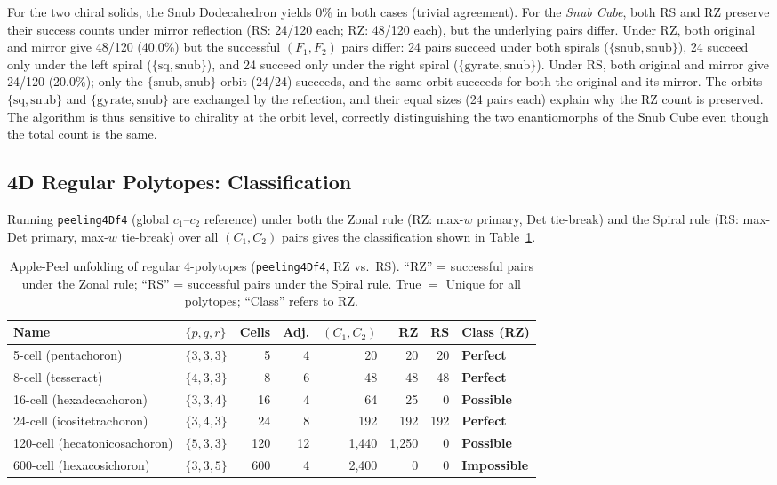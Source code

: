 \documentclass[12pt,a4paper]{article}
\theoremstyle{definition}
\begin{document}
For the two chiral solids, the Snub Dodecahedron yields 0\% in both cases
(trivial agreement).
For the \emph{Snub Cube}, both RS and RZ preserve their success counts
under mirror reflection (RS: 24/120 each; RZ: 48/120 each),
but the underlying pairs differ.
Under RZ, both original and mirror give 48/120 (40.0\%) but
the successful $(F_1,F_2)$ pairs differ: 24 pairs succeed under both spirals
($\{\mathrm{snub},\mathrm{snub}\}$), 24 succeed only under the left spiral
($\{\mathrm{sq},\mathrm{snub}\}$), and 24 succeed only under the right spiral
($\{\mathrm{gyrate},\mathrm{snub}\}$).
Under RS, both original and mirror give 24/120 (20.0\%);
only the $\{\mathrm{snub},\mathrm{snub}\}$ orbit (24/24) succeeds,
and the same orbit succeeds for both the original and its mirror.
The orbits $\{\mathrm{sq},\mathrm{snub}\}$ and $\{\mathrm{gyrate},\mathrm{snub}\}$
are exchanged by the reflection, and their equal sizes (24 pairs each) explain
why the RZ count is preserved.
The algorithm is thus sensitive to chirality at the orbit level, correctly
distinguishing the two enantiomorphs of the Snub Cube even though the total
count is the same.

\subsection{4D Regular Polytopes: Classification}
\label{ssec:res4d}

Running \texttt{peeling4Df4} (global $c_1$--$c_2$ reference) under both
the Zonal rule (RZ: max-$w$ primary, Det tie-break) and the Spiral rule
(RS: max-Det primary, max-$w$ tie-break)
over all $(C_1, C_2)$ pairs gives the classification shown in
Table~\ref{tab:results}.

\begin{table}[h]
\centering
\caption{Apple-Peel unfolding of regular 4-polytopes (\texttt{peeling4Df4}, RZ vs.\ RS).
  ``RZ'' = successful pairs under the Zonal rule; ``RS'' = successful pairs under
  the Spiral rule. True $=$ Unique for all polytopes; ``Class'' refers to RZ.}
\label{tab:results}
\small
\setlength{\tabcolsep}{3pt}
\begin{tabular}{llrrrrrl}
\toprule
Name & $\{p,q,r\}$ & Cells & Adj. & $(C_1,C_2)$ & RZ & RS & Class (RZ) \\
\midrule
5-cell (pentachoron)           & $\{3,3,3\}$ &   5 &  4 &    20   &     20 &     20 & \textbf{Perfect}    \\
8-cell (tesseract)             & $\{4,3,3\}$ &   8 &  6 &    48   &     48 &     48 & \textbf{Perfect}    \\
16-cell (hexadecachoron)       & $\{3,3,4\}$ &  16 &  4 &    64   &     25 &      0 & \textbf{Possible}   \\
24-cell (icositetrachoron)     & $\{3,4,3\}$ &  24 &  8 &   192   &    192 &    192 & \textbf{Perfect}    \\
120-cell (hecatonicosachoron)  & $\{5,3,3\}$ & 120 & 12 & 1{,}440 & 1{,}250 &      0 & \textbf{Possible}   \\
600-cell (hexacosichoron)      & $\{3,3,5\}$ & 600 &  4 & 2{,}400 &      0 &      0 & \textbf{Impossible} \\
\bottomrule
\end{tabular}
\end{table}
\end{document}

